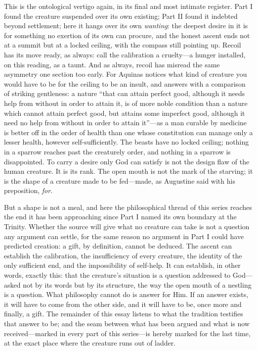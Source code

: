 This is the ontological vertigo again, in its final and most intimate register. Part I found the creature suspended over its own existing; Part II found it indebted beyond settlement; here it hangs over its own \emph{wanting}: the deepest desire in it is for something no exertion of its own can procure, and the honest ascent ends not at a summit but at a locked ceiling, with the compass still pointing up. Recoil has its move ready, as always: call the calibration a cruelty---a hunger installed, on this reading, as a taunt. And as always, recoil has misread the same asymmetry one section too early. For Aquinas notices what kind of creature you would have to be for the ceiling to be an insult, and answers with a comparison of striking gentleness: a nature ``that can attain perfect good, although it needs help from without in order to attain it, is of more noble condition than a nature which cannot attain perfect good, but attains some imperfect good, although it need no help from without in order to attain it''---as a man curable by medicine is better off in the order of health than one whose constitution can manage only a lesser health, however self-sufficiently. The beasts have no locked ceiling; nothing in a sparrow reaches past the creaturely order, and nothing in a sparrow is disappointed. To carry a desire only God can satisfy is not the design flaw of the human creature. It is its rank. The open mouth is not the mark of the starving; it is the shape of a creature made to be fed---made, as Augustine said with his preposition, \emph{for}.

But a shape is not a meal, and here the philosophical thread of this series reaches the end it has been approaching since Part I named its own boundary at the Trinity. Whether the source will give what no creature can take is not a question any argument can settle, for the same reason no argument in Part I could have predicted creation: a gift, by definition, cannot be deduced. The ascent can establish the calibration, the insufficiency of every creature, the identity of the only sufficient end, and the impossibility of self-help. It can establish, in other words, exactly this: that the creature's situation is a question addressed to God---asked not by its words but by its structure, the way the open mouth of a nestling is a question. What philosophy cannot do is answer for Him. If an answer exists, it will have to come from the other side, and it will have to be, once more and finally, a gift. The remainder of this essay listens to what the tradition testifies that answer to be; and the seam between what has been argued and what is now received---marked in every part of this series---is hereby marked for the last time, at the exact place where the creature runs out of ladder.
